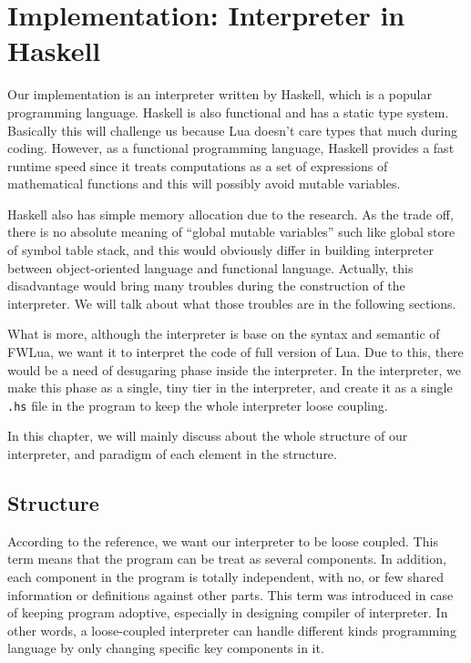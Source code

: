 \chapter{Implementation: Interpreter in Haskell}
Our implementation is an interpreter written by Haskell, which is a popular programming language. Haskell is also functional and has a static type system. Basically this will challenge us because Lua doesn't care types that much during coding. However, as a functional programming language, Haskell provides a fast runtime speed since it treats computations as a set of expressions of mathematical functions and this will possibly avoid mutable variables. 

Haskell also has simple memory allocation due to the research\cite{PIH}. As the trade off, there is no absolute meaning of ``global mutable variables'' such like global store of symbol table stack, and this would obviously differ in building interpreter between object-oriented language and functional language. Actually, this disadvantage would bring many troubles during the construction of the interpreter. We will talk about what those troubles are in the following sections.

What is more, although the interpreter is base on the syntax and semantic of FWLua, we want it to interpret the code of full version of Lua. Due to this, there would be a need of desugaring phase inside the interpreter. In the interpreter, we make this phase as a single, tiny tier in the interpreter, and create it as a single {\tt .hs} file in the program to keep the whole interpreter loose coupling.

In this chapter, we will mainly discuss about the whole structure of our interpreter, and paradigm of each element in the structure.

\section{Structure}
According to the reference\cite{WCAI}, we want our interpreter to be loose coupled\cite{looseC}. This term means that the program can be treat as several components. In addition, each component in the program is totally independent, with no, or few shared information or definitions against other parts. This term was introduced in case of keeping program adoptive, especially in designing compiler of interpreter. In other words, a loose-coupled interpreter can handle different kinds programming language by only changing specific key components in it.

